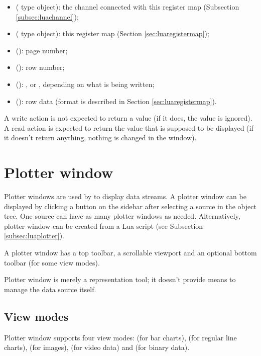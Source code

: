 \documentclass[a4paper,12pt,twoside,extrafontsizes]{memoir}
\begin{document}
\begin{itemize}
	\item {} ( type object): the channel connected with this register map (Subsection \ref{subsec:luachannel});
	\item {} ( type object): this register map (Section \ref{sec:luaregistermap});
	\item {} (): page number;
	\item {} (): row number;
	\item {} (): ,  or , depending on what is being written;
	\item {} (): row data (format is described in Section \ref{sec:luaregistermap}).
\end{itemize}

A write action is not expected to return a value (if it does, the value is ignored). A read action is expected to return the value that is supposed to be displayed (if it doesn't return anything, nothing is changed in the window).

\chapter{Plotter window}
\label{ch:plotter}

Plotter windows are used by  to display data streams. A plotter window can be displayed by clicking a  button on the sidebar after selecting a source in the object tree. One source can have as many plotter windows as needed. Alternatively, plotter window can be created from a Lua script (see Subsection \ref{subsec:luaplotter}).

A plotter window has a top toolbar, a scrollable viewport and an optional bottom toolbar (for some view modes).

Plotter window is merely a representation tool; it doesn't provide means to manage the data source itself.

\section{View modes}

Plotter window supports four view modes:  (for bar charts),  (for regular line charts),  (for images),  (for video data) and  (for binary data).
\end{document}
